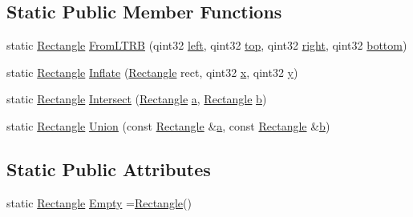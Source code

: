 \subsection*{Static Public Member Functions}
\begin{DoxyCompactItemize}
\item 
static \hyperlink{structinternals_1_1_rectangle}{Rectangle} \hyperlink{group___o_p_map_widget_gabe5c3b8c9edda8d902d997d47d9dc795}{From\-L\-T\-R\-B} (qint32 \hyperlink{glext_8h_a85b8f6c07fbc1fb5d77c2ae090f21995}{left}, qint32 \hyperlink{glext_8h_a5ab323daeacf8dfdb8f91132fecdca23}{top}, qint32 \hyperlink{glext_8h_a5ffadbbacc6b89cf6218bc43b384d3fe}{right}, qint32 \hyperlink{glext_8h_a95fc257e5ddf46f7db9d5e898cdf1991}{bottom})
\item 
static \hyperlink{structinternals_1_1_rectangle}{Rectangle} \hyperlink{group___o_p_map_widget_ga2968ca81b2ca433a710253f3c6168d36}{Inflate} (\hyperlink{structinternals_1_1_rectangle}{Rectangle} rect, qint32 \hyperlink{glext_8h_a1db9d104e3c2128177f26aff7b46982f}{x}, qint32 \hyperlink{glext_8h_a42315f3ed8fff752bb47fd782309fcfc}{y})
\item 
static \hyperlink{structinternals_1_1_rectangle}{Rectangle} \hyperlink{group___o_p_map_widget_ga6d1eb93d1aabfc6ef4c65cf4e81ea6c2}{Intersect} (\hyperlink{structinternals_1_1_rectangle}{Rectangle} \hyperlink{glext_8h_ac8729153468b5dcf13f971b21d84d4e5}{a}, \hyperlink{structinternals_1_1_rectangle}{Rectangle} \hyperlink{glext_8h_a6eba317e3cf44d6d26c04a5a8f197dcb}{b})
\item 
static \hyperlink{structinternals_1_1_rectangle}{Rectangle} \hyperlink{group___o_p_map_widget_ga9a93d2cc4abc1f3c2b053dca4311fd33}{Union} (const \hyperlink{structinternals_1_1_rectangle}{Rectangle} \&\hyperlink{glext_8h_ac8729153468b5dcf13f971b21d84d4e5}{a}, const \hyperlink{structinternals_1_1_rectangle}{Rectangle} \&\hyperlink{glext_8h_a6eba317e3cf44d6d26c04a5a8f197dcb}{b})
\end{DoxyCompactItemize}
\subsection*{Static Public Attributes}
\begin{DoxyCompactItemize}
\item 
static \hyperlink{structinternals_1_1_rectangle}{Rectangle} \hyperlink{group___o_p_map_widget_ga747b738c524d1f0bb7b4a00e9de42da4}{Empty} =\hyperlink{structinternals_1_1_rectangle}{Rectangle}()
\end{DoxyCompactItemize}
